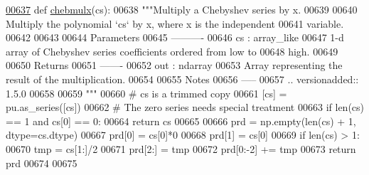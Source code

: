 \begin{DoxyCode}
\hypertarget{namespacepyneb_1_1utils_1_1chebyshev_l00637}{}\hyperlink{namespacepyneb_1_1utils_1_1chebyshev_ab09f8accee50bd964e03071a659a7b5f}{00637} \textcolor{keyword}{def }\hyperlink{namespacepyneb_1_1utils_1_1chebyshev_ab09f8accee50bd964e03071a659a7b5f}{chebmulx}(cs):
00638     \textcolor{stringliteral}{"""Multiply a Chebyshev series by x.}
00639 \textcolor{stringliteral}{}
00640 \textcolor{stringliteral}{    Multiply the polynomial `cs` by x, where x is the independent}
00641 \textcolor{stringliteral}{    variable.}
00642 \textcolor{stringliteral}{}
00643 \textcolor{stringliteral}{}
00644 \textcolor{stringliteral}{    Parameters}
00645 \textcolor{stringliteral}{    ----------}
00646 \textcolor{stringliteral}{    cs : array\_like}
00647 \textcolor{stringliteral}{        1-d array of Chebyshev series coefficients ordered from low to}
00648 \textcolor{stringliteral}{        high.}
00649 \textcolor{stringliteral}{}
00650 \textcolor{stringliteral}{    Returns}
00651 \textcolor{stringliteral}{    -------}
00652 \textcolor{stringliteral}{    out : ndarray}
00653 \textcolor{stringliteral}{        Array representing the result of the multiplication.}
00654 \textcolor{stringliteral}{}
00655 \textcolor{stringliteral}{    Notes}
00656 \textcolor{stringliteral}{    -----}
00657 \textcolor{stringliteral}{    .. versionadded:: 1.5.0}
00658 \textcolor{stringliteral}{}
00659 \textcolor{stringliteral}{    """}
00660     \textcolor{comment}{# cs is a trimmed copy}
00661     [cs] = pu.as\_series([cs])
00662     \textcolor{comment}{# The zero series needs special treatment}
00663     \textcolor{keywordflow}{if} len(cs) == 1 \textcolor{keywordflow}{and} cs[0] == 0:
00664         \textcolor{keywordflow}{return} cs
00665 
00666     prd = np.empty(len(cs) + 1, dtype=cs.dtype)
00667     prd[0] = cs[0]*0
00668     prd[1] = cs[0]
00669     \textcolor{keywordflow}{if} len(cs) > 1:
00670         tmp = cs[1:]/2
00671         prd[2:] = tmp
00672         prd[0:-2] += tmp
00673     \textcolor{keywordflow}{return} prd
00674 
00675 
\end{DoxyCode}
\hypertarget{namespacepyneb_1_1utils_1_1chebyshev_ab647ff3aa7750a09b934b98cddd4c90d}{}
